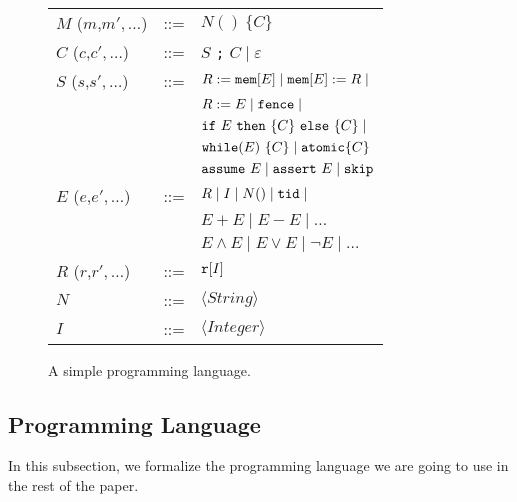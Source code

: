 \begin{figure}
\begin{tabular}{lcl}
$M$ ($m$,$m',\ldots$) & ::= & $N()\ \{ C \}$\\
$C$ ($c$,$c',\ldots$) & ::= & $S$ {\tt ;} $C \mid \varepsilon$\\
$S$ ($s$,$s',\ldots$) & ::= & $R := \mathtt{mem}[E] \mid \mathtt{mem}[E] := R \mid$\\
& &  $R := E \mid \mathtt{fence} \mid$\\
& & $\mathtt{if}\ E\ \mathtt{then}\ \{C\}\ \mathtt{else}\ \{C\}\mid$\\ 
& & $\mathtt{while}(E)\ \{C\}\mid \mathtt{atomic}\{C\}$\\
& & $\mathtt{assume}\ E \mid \mathtt{assert}\ E \mid \mathtt{skip}$\\
$E$ ($e$,$e',\ldots$) & ::= & $R \mid I \mid N() \mid \mathtt{tid} \mid$\\
& & $E+E \mid E-E \mid \ldots$\\
& & $E\wedge E \mid E\vee E \mid \neg E \mid \ldots $\\
$R$ ($r$,$r',\ldots$) & ::= & $\mathtt{r}[I]$\\
$N$ & ::= & $\langle String\rangle$\\
$I$ & ::= & $\langle Integer\rangle$
\end{tabular}
\label{fig:program-grammar}
\caption{A simple programming language.}
\end{figure}

\newcommand{\aliprogstmt}{\ensuremath{\mathsf{Stmt}}}
\newcommand{\aliprogstmtx}[1]{\ensuremath{\aliprogstmt(#1)}}
\newcommand{\alilabel}{\ensuremath{\mathsf{Lab}}}
\newcommand{\alilabelx}[1]{\ensuremath{\alilabel(#1)}}

\subsection{Programming Language}
\label{subsec:programming-language}
In this subsection, we formalize the programming language we are going to use in the rest of the paper.


